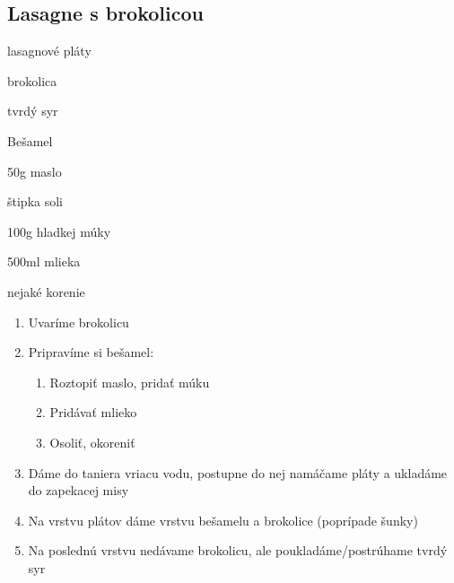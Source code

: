 \setcounter{step}{0}
\subsection{Lasagne s brokolicou}

\begin{ingredient}
\def\portions{4}%

\begin{main}
	\item lasagnové pláty
	\item brokolica
	\item tvrdý syr
\end{main}
\begin{subingredient}{Bešamel}
	\item 50g maslo
	\item štipka soli
	\item 100g hladkej múky
	\item 500ml mlieka
	\item nejaké korenie
\end{subingredient}
\end{ingredient}
\begin{recipe}

\begin{enumerate}

\item{Uvaríme brokolicu}
\item{Pripravíme si bešamel:}
\begin{enumerate}
\item{Roztopiť maslo, pridať múku}
\item{Pridávať mlieko}
\item{Osoliť, okoreniť}
\end{enumerate}

\item{Dáme do taniera vriacu vodu, postupne do nej namáčame pláty a ukladáme do zapekacej misy}
\item{Na vrstvu plátov dáme vrstvu bešamelu a brokolice (poprípade šunky)}
\item{Na poslednú vrstvu nedávame brokolicu, ale poukladáme/postrúhame tvrdý syr}

\end{enumerate}
\end{recipe}

\begin{notes}

\end{notes}
\clearpage	